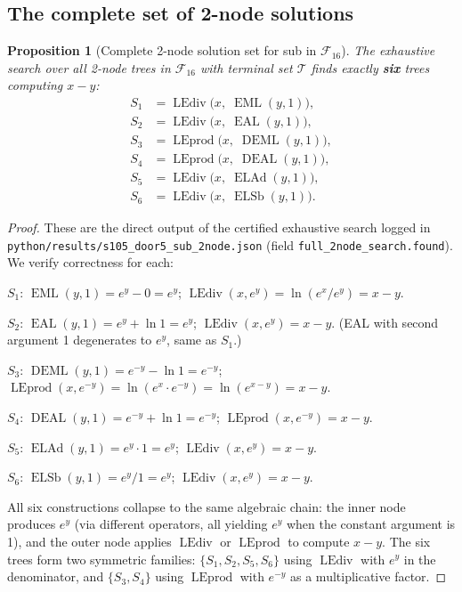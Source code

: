 \documentclass[12pt,a4paper]{article}
\newtheorem{proposition}[theorem]{Proposition}
\theoremstyle{definition}
\newcommand{\EML}{\operatorname{EML}}
\newcommand{\EAL}{\operatorname{EAL}}
\newcommand{\DEML}{\operatorname{DEML}}
\newcommand{\ELAd}{\operatorname{ELAd}}
\newcommand{\ELSb}{\operatorname{ELSb}}
\newcommand{\LEdiv}{\operatorname{LEdiv}}
\newcommand{\LEprod}{\operatorname{LEprod}}
\newcommand{\DEAL}{\operatorname{DEAL}}
\begin{document}
\subsection{The complete set of 2-node solutions}

\begin{proposition}[Complete 2-node solution set for sub in $\mathcal{F}_{16}$]\label{prop:six}
The exhaustive search over all 2-node trees in $\mathcal{F}_{16}$ with
terminal set $\mathcal{T}$ finds exactly \textbf{six} trees computing $x-y$:
\begin{align*}
  S_1 &= \LEdiv\!\bigl(x,\;\EML(y,1)\bigr),  \\
  S_2 &= \LEdiv\!\bigl(x,\;\EAL(y,1)\bigr),  \\
  S_3 &= \LEprod\!\bigl(x,\;\DEML(y,1)\bigr), \\
  S_4 &= \LEprod\!\bigl(x,\;\DEAL(y,1)\bigr), \\
  S_5 &= \LEdiv\!\bigl(x,\;\ELAd(y,1)\bigr),  \\
  S_6 &= \LEdiv\!\bigl(x,\;\ELSb(y,1)\bigr).
\end{align*}
\end{proposition}

\begin{proof}
These are the direct output of the certified exhaustive search logged in
\texttt{python/results/s105\_door5\_sub\_2node.json} (field
\texttt{full\_2node\_search.found}).
We verify correctness for each:

\medskip
\noindent$S_1$: $\EML(y,1)=e^y-0=e^y$;\quad
$\LEdiv(x,e^y)=\ln(e^x/e^y)=x-y$. \checkmark

\medskip
\noindent$S_2$: $\EAL(y,1)=e^y+\ln 1=e^y$;\quad
$\LEdiv(x,e^y)=x-y$. \checkmark
\smallskip
(EAL with second argument 1 degenerates to $e^y$, same as $S_1$.)

\medskip
\noindent$S_3$: $\DEML(y,1)=e^{-y}-\ln 1=e^{-y}$;\quad
$\LEprod(x,e^{-y})=\ln(e^x\cdot e^{-y})=\ln(e^{x-y})=x-y$. \checkmark

\medskip
\noindent$S_4$: $\DEAL(y,1)=e^{-y}+\ln 1=e^{-y}$;\quad
$\LEprod(x,e^{-y})=x-y$. \checkmark

\medskip
\noindent$S_5$: $\ELAd(y,1)=e^y\cdot 1=e^y$;\quad
$\LEdiv(x,e^y)=x-y$. \checkmark

\medskip
\noindent$S_6$: $\ELSb(y,1)=e^y/1=e^y$;\quad
$\LEdiv(x,e^y)=x-y$. \checkmark

\medskip
All six constructions collapse to the same algebraic chain: the inner node
produces $e^y$ (via different operators, all yielding $e^y$ when the constant
argument is 1), and the outer node applies $\LEdiv$ or $\LEprod$ to compute
$x-y$.  The six trees form two symmetric families:
$\{S_1,S_2,S_5,S_6\}$ using $\LEdiv$ with $e^y$ in the denominator, and
$\{S_3,S_4\}$ using $\LEprod$ with $e^{-y}$ as a multiplicative factor.
\end{proof}
\end{document}
